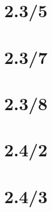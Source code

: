 \documentclass[11pt,a4paper]{article}
\author{刘逸灏 (515370910207)}
\begin{document}
\maketitle

\section{2.3/5}
\section{2.3/7}
\section{2.3/8}
\section{2.4/2}
\section{2.4/3}
\end{document}
